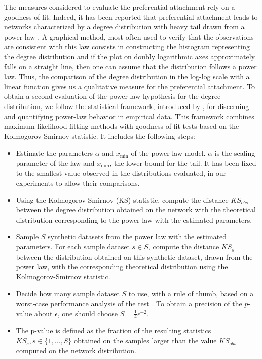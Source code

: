 The measures considered to evaluate the preferential attachment rely on a goodness of fit. Indeed, it has been reported that preferential attachment leads to networks characterized by a degree distribution with heavy tail drawn from a power law \cite{barabasi1999emergence}. A graphical method, most often used to verify that the observations are consistent with this law  consists in constructing the histogram representing the degree distribution and if the plot on doubly logarithmic axes approximately falls on a straight line, then one can assume that the distribution follows a power law. Thus, the comparison of the degree distribution in the log-log scale with a linear function gives us a qualitative measure for the preferential attachment. To obtain a second evaluation of the power law hypothesis for the degree distribution, we follow the statistical framework, introduced by \cite{clauset2009power}, for discerning and quantifying power-law behavior in empirical data. This framework combines maximum-likelihood fitting methods with goodness-of-fit tests based on the Kolmogorov-Smirnov statistic. It includes the following steps:


\begin{itemize}
	\item Estimate the parameters $\alpha$ and $x_\text{min}$ of the power law model. $\alpha$ is the scaling parameter of the law and $x_\text{min}$, the lower bound for the tail. It has been fixed to the smallest value observed in the distributions evaluated, in our experiments to allow their comparisons.
	\item  Using the Kolmogorov-Smirnov (KS) statistic, compute the distance $KS_{obs}$  between the degree distribution obtained on the network with the theoretical distribution corresponding to the power law with the estimated parameters.
	\item Sample $S$ synthetic datasets from the power law with the estimated parameters. For each sample  dataset $s \in S$, compute the distance $KS_{s}$ between the distribution obtained on this synthetic dataset, drawn from the power law, with the corresponding theoretical distribution using the Kolmogorov-Smirnov statistic. 
    \item Decide how many sample dataset $S$ to use, with a rule of thumb, based on a worst-case performance analysis of the test \cite{clauset2009power}. To obtain a precision of the $p$-value about $\epsilon$, one should choose $S = \frac{1}{4}\epsilon^{-2}$.  
    \item  The p-value is defined as the fraction of the resulting statistics $KS_s, s \in \{1,...,S\}$ obtained on the samples larger than the value $KS_{obs}$ computed on the network distribution.  
\end{itemize}

